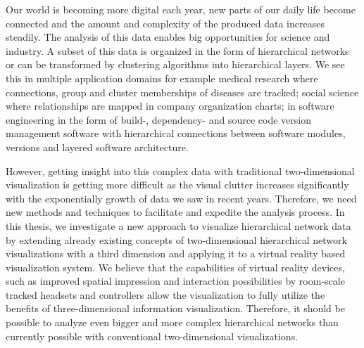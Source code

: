 Our world is becoming more digital each year, new parts of our daily life become connected and the amount and complexity of the produced data increases steadily.
The analysis of this data enables big opportunities for science and industry.
A subset of this data is organized in the form of hierarchical networks or can be transformed by clustering algorithms into hierarchical layers. We see this in multiple application domains for example medical research where connections, group and cluster memberships of diseases are tracked; social science where relationships are mapped in company organization charts; in software engineering in the form of build-, dependency- and source code version management software with hierarchical connections between software modules, versions and layered software architecture.

However, getting insight into this complex data with traditional two-dimensional visualization is getting more difficult as the visual clutter increases significantly with the exponentially growth of data we saw in recent years. Therefore, we need new methods and techniques to facilitate and expedite the analysis process.
In this thesis, we investigate a new approach to visualize hierarchical network data by extending already existing concepts of two-dimensional hierarchical network visualizations with a third dimension and applying it to a virtual reality based visualization system. We believe that the capabilities of virtual reality devices, such as improved spatial impression and interaction possibilities by room-scale tracked headsets and controllers allow the visualization to fully utilize the benefits of three-dimensional information visualization. Therefore, it should be possible to analyze even bigger and more complex hierarchical networks than currently possible with conventional two-dimensional visualizations.